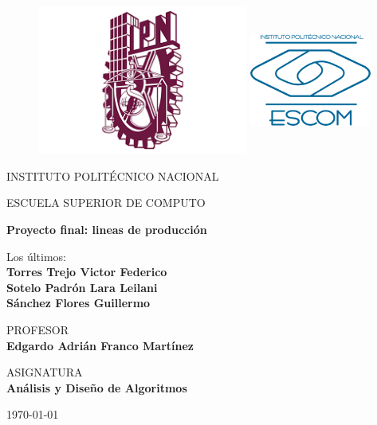 \documentclass[12 pt]{report}
\begin{document}
\thispagestyle{empty}

\begin{figure}[ht]
  \includegraphics[height = 4.9cm ]{extras/Logo_IPN.png}
  \label{EscudoIPN}
  \endminipage
  \includegraphics[height = 4.9cm ,width=4cm]{extras/Logo_ESCOM.png}
  \label{EscudoESCOM}
  \endminipage
\end{figure}

\begin{center}
  \vspace{0.8cm}
  \LARGE
  INSTITUTO POLITÉCNICO NACIONAL
  
  \vspace{0.8cm}
  \LARGE
  ESCUELA SUPERIOR DE COMPUTO
  
  \vspace{1.5cm}	
  \Large
  \textbf{Proyecto final: lineas de producción}

  \vspace{1.0cm}
  \normalsize	
  Los últimos:  \\
  \vspace{.3cm}
  \large
  \textbf{Torres Trejo Victor Federico \\ Sotelo Padrón Lara Leilani \\ Sánchez Flores Guillermo}
  
  \vspace{1cm}
  \normalsize	
  PROFESOR \\
  \vspace{.3cm}
  \large
  \textbf{Edgardo Adrián Franco Martínez}

  \vspace{1cm}
  \normalsize	
  ASIGNATURA \\
  \vspace{.3cm}
  \large
  \textbf{Análisis y Diseño de Algoritmos\\}
  
  \vspace{1cm}
  \today
\end{center}
\end{document}
